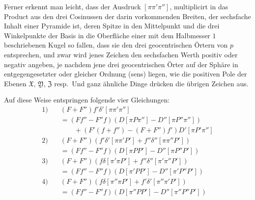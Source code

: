 Ferner erkennt man leicht, dass der Ausdruck $[\pi\pi'\pi'']$, multiplicirt in das Product aus den drei Cosinussen der darin vorkommenden Breiten, der sechsfache Inhalt einer Pyramide ist, deren Spitze in den Mittelpunkt und die drei Winkelpunkte der Basis in die Oberfläche einer mit dem Halbmesser $1$ beschriebenen Kugel so fallen, dass sie den drei geocentrischen Örtern von $p$ entsprechen, und zwar wird jenes Zeichen den sechsfachen Werth positiv oder negativ angeben, je nachdem jene drei geocentrischen Örter auf der Sphäre in entgegengesetzter oder gleicher Ordnung (sens) liegen, wie die positiven Pole der Ebenen $\mathfrak{X}$, $\mathfrak{Y}$, $\mathfrak{Z}$ resp.\ Und ganz ähnliche Dinge drücken die übrigen Zeichen aus.

Auf diese Weise entspringen folgende vier Gleichungen:
\[
\begin{aligned}
1)\quad &(F+F'')f'\delta'[\pi\pi'\pi'']\\
&=(Ff''-F''f)(D[\pi P\pi'']-D''[\pi P''\pi''])\\
&\qquad+(F'(f+f'')-(F+F'')f')D'[\pi P'\pi'']\\
2)\quad &(F+F'')(f'\delta'[\pi\pi'P']+f''\delta''[\pi\pi''P'])\\
&=(Ff''-F''f)(D[\pi PP']-D''[\pi P''P'])\\
3)\quad &(F+F'')(f\delta[\pi'\pi P']+f''\delta''[\pi'\pi''P'])\\
&=(Ff''-F''f)(D[\pi'PP']-D''[\pi'P''P'])\\
4)\quad &(F+F'')(f\delta[\pi''\pi P']+f'\delta'[\pi''\pi'P'])\\
&=(Ff''-F''f)(D[\pi''PP']-D''[\pi''P''P'])
\end{aligned}
\]

